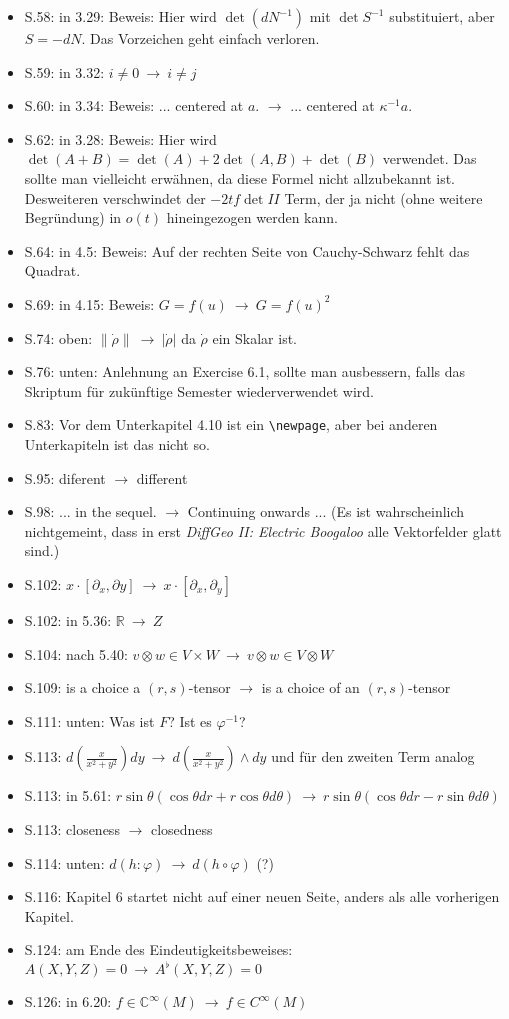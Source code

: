 \documentclass[a4paper,11pt,notitlepage,fullpage]{article}
\newcommand{\s}{\item S.}
\begin{document}
\begin{itemize}
\s 58: in 3.29: Beweis: Hier wird $\det(dN^{-1})$ mit $\det S^{-1}$ substituiert, aber $S = - dN$. Das Vorzeichen geht einfach verloren.
\s 59: in 3.32: $i \neq 0 ~\rightarrow~ i \neq j$
\s 60: in 3.34: Beweis: ... centered at $a$. $\rightarrow$ ... centered at $\kappa^{-1} a$.
\s 62: in 3.28: Beweis: Hier wird $\det(A+B) = \det(A) + 2\det(A, B) + \det(B)$ verwendet. Das sollte man vielleicht erwähnen, da diese Formel nicht allzubekannt ist. Desweiteren verschwindet der $-2tf\det II$ Term, der ja nicht (ohne weitere Begründung) in $o(t)$ hineingezogen werden kann.
\s 64: in 4.5: Beweis: Auf der rechten Seite von Cauchy-Schwarz fehlt das Quadrat.
\s 69: in 4.15: Beweis: $G = f(u) ~\rightarrow~ G = f(u)^2$
\s 74: oben: $\|\dot \rho\| ~\rightarrow~ |\dot\rho|$ da $\dot\rho$ ein Skalar ist.
\s 76: unten: Anlehnung an Exercise 6.1, sollte man ausbessern, falls das Skriptum für zukünftige Semester wiederverwendet wird.
\s 83: Vor dem Unterkapitel 4.10 ist ein \verb+\newpage+, aber bei anderen Unterkapiteln ist das nicht so.
\s 95: diferent $\rightarrow$ different
\s 98: ... in the sequel. $\rightarrow$ Continuing onwards ... (Es ist wahrscheinlich nichtgemeint, dass in erst \emph{DiffGeo II: Electric Boogaloo} alle Vektorfelder glatt sind.)
\s 102: $x \cdot [\partial_x, \partial y] ~\rightarrow~ x \cdot [\partial_x, \partial_y]$
\s 102: in 5.36: $\mathbb R ~\rightarrow~ Z$
\s 104: nach 5.40: $v \otimes w \in V \times W ~\rightarrow~ v \otimes w \in V \otimes W$
\s 109: is a choice a $(r, s)$-tensor $\rightarrow$ is a choice of an $(r, s)$-tensor
\s 111: unten: Was ist $F$? Ist es $\varphi^{-1}$?
\s 113: $d(\frac{x}{x^2+y^2})dy ~\rightarrow~ d(\frac{x}{x^2+y^2})\wedge dy$ und für den zweiten Term analog
\s 113: in 5.61: $r \sin \theta (\cos \theta dr + r \cos \theta d\theta) ~\rightarrow~ r \sin \theta (\cos \theta dr - r \sin \theta d\theta)$
\s 113: closeness $\rightarrow$ closedness
\s 114: unten: $d(h: \varphi) ~\rightarrow~ d(h\circ \varphi)$ (?)
\s 116: Kapitel 6 startet nicht auf einer neuen Seite, anders als alle vorherigen Kapitel.
\s 124: am Ende des Eindeutigkeitsbeweises: $A(X,Y,Z) = 0 ~\rightarrow~ A^\flat(X,Y,Z) = 0$
\s 126: in 6.20: $f \in \mathbb C^\infty(M) ~\rightarrow~ f \in C^\infty(M)$





\end{itemize}
\end{document}
